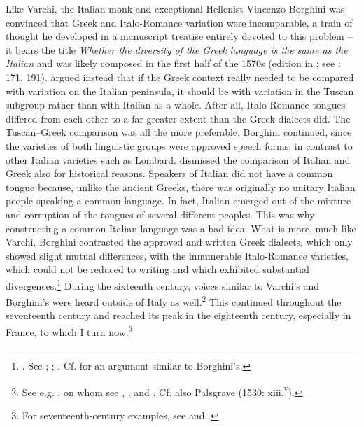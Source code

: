 Like Varchi, the Italian monk and exceptional Hellenist Vincenzo Borghini was convinced that Greek and Italo-Romance variation were incomparable, a train of thought he developed in a manuscript treatise entirely devoted to this problem – it bears the title \textit{Whether the diversity of the Greek language is the same as the Italian} and was likely composed in the first half of the 1570s (edition in \citealt{Borghini1971}; see \citealt{Alinei1984}: 171, 191). \citet[335]{Borghini1971} argued instead that if the Greek context really needed to be compared with variation on the Italian peninsula, it should be with variation in the Tuscan subgroup rather than with Italian as a whole. After all, Italo-Romance tongues differed from each other to a far greater extent than the Greek dialects did. The Tuscan–Greek comparison was all the more preferable, Borghini continued, since the varieties of both linguistic groups were approved speech forms, in contrast to other Italian varieties such as Lombard. \citet[338--340]{Borghini1971} dismissed the comparison of Italian and Greek also for historical reasons. Speakers of Italian did not have a common tongue because, unlike the ancient Greeks, there was originally no unitary Italian people speaking a common language. In fact, Italian emerged out of the mixture and corruption of the tongues of several different peoples. This was why constructing a common Italian language was a bad idea. What is more, much like Varchi, Borghini contrasted the approved and written Greek dialects, which only showed slight mutual differences, with the innumerable Italo-Romance varieties, which could not be reduced to writing and which exhibited substantial divergences.\footnote{\citet[341]{Borghini1971}. See \citet[171]{Alinei1984}; \citet[210]{Trovato1984}; \citet[32--37]{Beninca1988}. Cf. \citet[253--254]{Salviati1588} for an argument similar to Borghini’s.} During the sixteenth century, voices similar to Varchi’s and Borghini’s were heard outside of Italy as well.\footnote{See e.g. \citet[595--596]{Wolf1578}, on whom see , \citet[\textsc{i}.58–59]{Jellinek1898, Jellinek1913}, and \citet[esp. 214--218]{Mattheier2003}. Cf. also Palsgrave (1530: xiii.\textsc{\textsuperscript{v}}).} This continued throughout the seventeenth century and reached its peak in the eighteenth century, especially in France, to which I turn now.\footnote{For seventeenth-century examples, see \citet[458--459]{Mambrun1661} and \citet[146--147]{Morhof1685}.}

